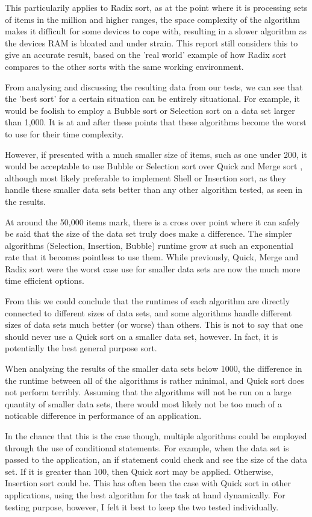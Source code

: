 \documentclass{acm_proc_article-sp}
\begin{document}
This particularily applies to Radix sort, as at the point where it is 
processing sets of items in the million and higher ranges, the space
complexity of the algorithm makes it difficult for some devices to cope with,
resulting in a slower algorithm as the devices RAM is bloated and under strain. This report
still considers this to give an accurate result, based on the 'real world' 
example of how Radix sort compares to the other sorts with the
same working environment.

From analysing and discussing the resulting data from our tests, we can 
see that the 'best sort' for a certain situation can be entirely situational.
For example, it would be foolish to employ a Bubble sort or Selection sort
on a data set larger than 1,000. It is at and after these points 
that these algorithms become the worst to use for their time complexity.

However, if presented with a much smaller size of items, such as one under
200, it would be acceptable to use Bubble or Selection sort over Quick and Merge sort
, although most likely preferable to implement Shell or Insertion sort, as
they handle these smaller data sets better than any other algorithm tested, as seen in the results.

At around the 50,000 items mark, there is a cross over point where it can safely
be said that the size of the data set truly does make a difference. The
simpler algorithms (Selection, Insertion, Bubble) runtime grow at such
an exponential rate that it becomes pointless to use them. While previously,
Quick, Merge and Radix sort were the worst case use for smaller data sets
are now the much more time efficient options.

From this we could conclude that the
runtimes of each algorithm are directly connected to different sizes of
data sets, and some algorithms handle different sizes of data sets much
better (or worse) than others. This is not to say that one should never
use a Quick sort on a smaller data set, however. In fact, it is potentially
the best general purpose sort.

When analysing the results of the smaller data sets below 1000, the difference in 
the runtime between all of the algorithms is rather minimal, and Quick
sort does not perform terribly. Assuming that the algorithms will not
be run on a large quantity of smaller data sets, there would most 
likely not be too much of a noticable difference in performance of
an application.

In the chance that this is the case though, multiple algorithms could be
employed through the use of conditional statements. For example,
when the data set is passed to the application, an if statement
could check and see the size of the data set. If it is greater than
100, then Quick sort may be applied. Otherwise, Insertion sort
could be. This has often been the case with Quick sort in other
applications, using the best algorithm for the task at hand dynamically.
 For testing purpose, however, I felt it best to keep
the two tested individually.
\end{document}
